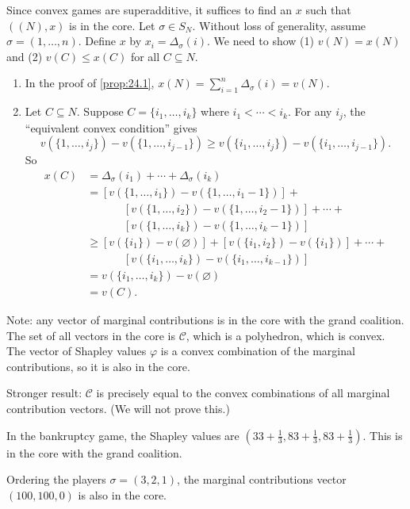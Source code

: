 \documentclass[12pt,letterpaper]{report}
\begin{document}
\begin{thmproof}
  Since convex games are superadditive, it suffices to find an $x$ such that $((N), x)$ is in the
  core.
  Let $\sigma \in S_N$.
  Without loss of generality, assume $\sigma = (1, \ldots, n)$.
  Define $x$ by $x_i = \Delta_\sigma(i)$.
  We need to show (1) $v(N) = x(N)$ and (2) $v(C) \leq x(C)$ for all $C \subseteq N$.
  \begin{enumerate}[label=(\arabic*)]
    \item
    In the proof of \cref{prop:24.1}, $x(N) = \sum\limits_{i = 1}^n \Delta_\sigma(i) = v(N)$.
    \item
    Let $C \subseteq N$.
    Suppose $C = \{i_1, \ldots, i_k\}$ where $i_1 < \cdots < i_k$.
    For any $i_j$, the ``equivalent convex condition'' gives
    \[
      v(\{1, \ldots, i_j\}) - v(\{1, \ldots, i_{j - 1}\}) \geq
        v(\{i_1, \ldots, i_j\}) - v(\{i_1, \ldots, i_{j - 1}\}).
    \]
    So
    \begin{align*}
      x(C) &= \Delta_\sigma(i_1) + \cdots + \Delta_\sigma(i_k) \\
      &= [ v(\{1, \ldots, i_1\}) - v(\{1, \ldots, i_1 - 1\}) ] +{} \\
      &\phantom{{}={}} \qquad
        [ v(\{1, \ldots, i_2\}) - v(\{1, \ldots, i_2 - 1\}) ] + \cdots +{} \\
      &\phantom{{}={}} \qquad
        [ v(\{1, \ldots, i_k\}) - v(\{1, \ldots, i_k - 1\}) ] \\
      &\geq [ v(\{i_1\}) - v(\varnothing) ] + [ v(\{i_1, i_2\}) - v(\{i_1\}) ] + \cdots +{} \\
      &\phantom{{}={}} \qquad
        [ v(\{i_1, \ldots, i_k\}) - v(\{i_1, \ldots, i_{k - 1}\}) ] \\
      &= v(\{i_1, \ldots, i_k\}) - v(\varnothing) \\
      &= v(C).
    \end{align*}
  \end{enumerate}
\end{thmproof}

Note: any vector of marginal contributions is in the core with the grand coalition.
The set of all vectors in the core is $\mathcal{C}$, which is a polyhedron, which is convex.
The vector of Shapley values $\varphi$ is a convex combination of the marginal contributions, so it
is also in the core.

Stronger result: $\mathcal{C}$ is precisely equal to the convex combinations of all marginal
contribution vectors.
(We will not prove this.)

\begin{ex}
  In the bankruptcy game, the Shapley values are
  $(33 + \frac{1}{3}, 83 + \frac{1}{3}, 83 + \frac{1}{3})$.
  This is in the core with the grand coalition.

  Ordering the players $\sigma = (3, 2, 1)$, the marginal contributions vector $(100, 100, 0)$ is
  also in the core.
\end{ex}

\end{document}
